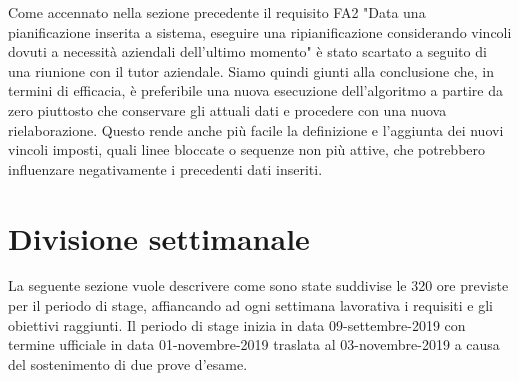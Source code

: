Come accennato nella sezione precedente il requisito FA2 "Data una pianificazione inserita a sistema, eseguire una
ripianificazione considerando vincoli dovuti a necessità aziendali
dell’ultimo momento" è stato scartato a seguito di una riunione con il tutor aziendale. Siamo quindi giunti alla conclusione che, in termini di efficacia, è preferibile una nuova esecuzione dell'algoritmo a partire da zero piuttosto che conservare gli attuali dati e procedere con una nuova rielaborazione. Questo rende anche più facile la definizione e l'aggiunta dei nuovi vincoli imposti, quali linee bloccate o sequenze non più attive, che potrebbero influenzare negativamente i precedenti dati inseriti.


\section{Divisione settimanale}

La seguente sezione vuole descrivere come sono state suddivise le 320 ore previste per il periodo di stage, affiancando ad ogni settimana lavorativa i requisiti e gli obiettivi raggiunti. Il periodo di stage inizia in data 09-settembre-2019 con termine ufficiale in data 01-novembre-2019 traslata al 03-novembre-2019 a causa del sostenimento di due prove d'esame.

